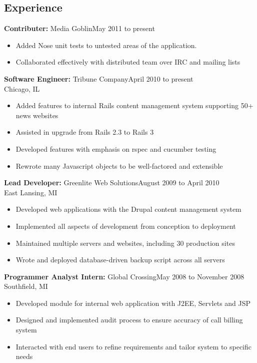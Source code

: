 \documentclass[11pt]{res}
\begin{document}


\begin{resume}


\section{Experience}
{\bf Contributer:} Media Goblin\dotfill May 2011 to present
\begin{itemize}
\item Added Nose unit tests to untested areas of the application.
\item Collaborated effectively with distributed team over IRC and mailing lists
\end{itemize}

{\bf Software Engineer:} Tribune Company\dotfill April 2010 to present\\
Chicago, IL
\begin{itemize}
\item Added features to internal Rails content management system
      supporting 50\footnotesize{+} \normalsize news websites
\item Assisted in upgrade from Rails 2.3 to Rails 3
\item Developed features with emphasis on rspec and cucumber testing
\item Rewrote many Javascript objects to be well-factored and extensible
\end{itemize}

{\bf Lead Developer:} Greenlite Web Solutions\dotfill August 2009 to April 2010\\
East Lansing, MI
\begin{itemize}
\item Developed web applications with the Drupal content management system
\item Implemented all aspects of development from conception to deployment
\item Maintained multiple servers and websites, including 30 production sites
\item Wrote and deployed database-driven backup script across all servers
\end{itemize}

{\bf Programmer Analyst Intern:} Global Crossing\dotfill May 2008 to November 2008\\
Southfield, MI
\begin{itemize}
\item Developed module for internal web application with J2EE, Servlets and JSP
\item Designed and implemented audit process to ensure accuracy of call billing system
\item Interacted with end users to refine requirements and tailor system to specific needs
\end{itemize}


\end{resume}
\end{document}
